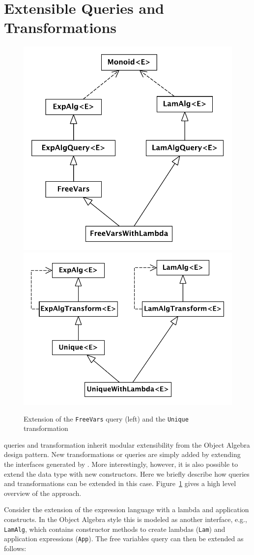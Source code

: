 

\section{Extensible Queries and Transformations}
\label{SECT:extensible}

\begin{figure}
  \centering

  \includegraphics[width=0.45\linewidth]{extendQuery}
  \hspace*{2pt}
  \vline
  \hspace*{2pt}
  \includegraphics[width=0.45\linewidth]{extendTransform}
  
  \caption{Extension of the \texttt{FreeVars} query (left) and the \texttt{Unique} transformation}
  \label{FIG:extension}
\end{figure}

\noindent \name queries and transformation inherit  modular extensibility from the Object Algebra design pattern.
New transformations or queries are simply added by extending the interfaces generated by \name.
More interestingly, however, it is also possible to extend the data type with new constructors.
Here we briefly describe how queries and transformations can be extended in this case.
Figure~\ref{FIG:extension} gives a high level overview of the approach.


Consider the extension of the expression language with a lambda and application constructs.
In the Object Algebra style this is modeled as another interface, e.g., \lstinline{LamAlg}, which contains constructor methods to create lambdas (\lstinline{Lam}) and application expressions (\lstinline{App}).
The free variables query can then be extended as follows:


